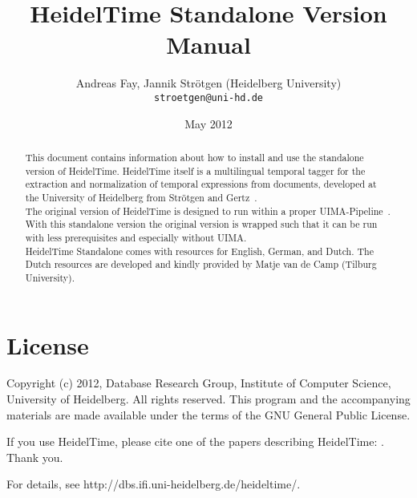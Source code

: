 \documentclass[
     11pt,         %
     a4paper,      %
     oneside,
     ]{article}
\begin{document}
\title{%
HeidelTime Standalone Version\\
Manual
}
\author{Andreas Fay, Jannik Str\"otgen (Heidelberg University)\\[0.2em]
\small \texttt{stroetgen@uni-hd.de}
}
\date{May 2012}
\maketitle

\begin{abstract}
This document contains information about how to install and use the standalone version of HeidelTime. HeidelTime itself is a multilingual temporal tagger for the extraction and normalization of temporal expressions from documents, developed at the University of Heidelberg from Str\"otgen and Gertz~\cite{Strotgen2010, HeidelTime, StroetgenGertz2012}.\\
The original version of HeidelTime is designed to run within a proper UIMA-Pipeline~\cite{UIMA}. With this standalone version the original version is wrapped such that it can be run with less prerequisites and especially without UIMA.\\
HeidelTime Standalone comes with resources for English, German, and Dutch. The Dutch resources are developed and kindly provided by Matje van de Camp (Tilburg University)\cite{Matje}.
\end{abstract}

\tableofcontents

%




\section{License}
Copyright (c) 2012, Database Research Group, Institute of Computer Science, University of Heidelberg. 
All rights reserved. This program and the accompanying materials 
are made available under the terms of the GNU General Public License.

If you use HeidelTime, please cite one of the papers describing HeidelTime: \cite{Strotgen2010, StroetgenGertz2012}. Thank you.

For details, see http://dbs.ifi.uni-heidelberg.de/heideltime/.







\end{document}
